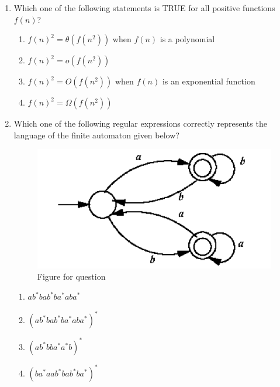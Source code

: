 \begin{enumerate}
\begin{enumerate}
\end{enumerate}

\hfill{}

\item Which one of the following statements is TRUE for all positive functions $f(n)$?  

\begin{enumerate}
\item $f(n)^2 = \theta(f(n^2))$ when $f(n)$ is a polynomial
\item $f(n)^2 = o(f(n^2))$
\item $f(n)^2 = O(f(n^2))$ when $f(n)$ is an exponential function
\item $f(n)^2 = \Omega(f(n^2))$
\end{enumerate}

\hfill{}

\item Which one of the following regular expressions correctly represents the language of the finite automaton given below?  
\begin{figure}[H]
\centering
\includegraphics[width=0.8\columnwidth]{figs/q12.png}
\caption{Figure for question}
\label{fig:q12}
\end{figure}
\begin{enumerate}
\item $ab^* bab^* ba^* aba^*$
\item $(ab^* b ab^* ba^* a ba^*)^*$
\item $(ab^* b ba^* a^* b)^*$
\item $(ba^* a ab^* b ab^* ba^*)^*$
\end{enumerate}


\end{enumerate}
